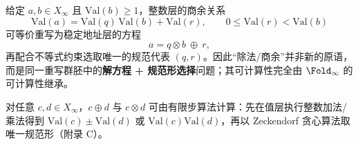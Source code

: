 \begin{remark}[商余作为规范形选择]\label{rem:division-as-selection}
给定 $a,b\in X_\infty$ 且 $\mathrm{Val}(b)\ge 1$，整数层的商余关系
\[
\mathrm{Val}(a)=\mathrm{Val}(q)\,\mathrm{Val}(b)+\mathrm{Val}(r),\qquad 0\le \mathrm{Val}(r)<\mathrm{Val}(b)
\]
可等价重写为稳定地址层的方程
\[
a=q\otimes b\ \oplus\ r,
\]
再配合不等式约束选取唯一的规范代表 $(q,r)$。因此“除法/商余”并非新的原语，而是同一重写群胚中的\textbf{解方程 + 规范形选择}问题；其可计算性完全由 $\Fold_\infty$ 的可计算性继承。
\end{remark}

\begin{proposition}[可计算实现]\label{prop:zeckendorf-arith-computable}
对任意 $c,d\in X_\infty$，$c\oplus d$ 与 $c\otimes d$ 可由有限步算法计算：先在值层执行整数加法/乘法得到 $\mathrm{Val}(c)\pm\mathrm{Val}(d)$ 或 $\mathrm{Val}(c)\mathrm{Val}(d)$，再以 Zeckendorf 贪心算法取唯一规范形（附录 C）。
\end{proposition}

